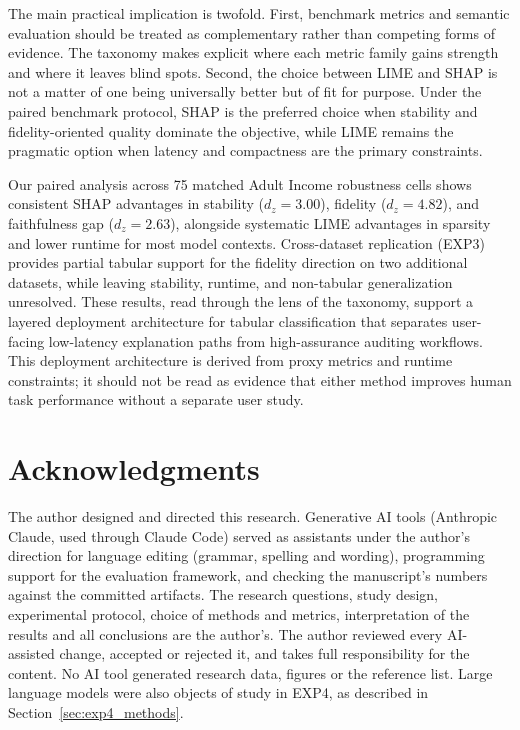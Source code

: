 \documentclass[10pt,a4paper,twoside]{article}
\begin{document}
The main practical implication is twofold. First, benchmark metrics and
semantic evaluation should be treated as complementary rather than
competing forms of evidence. The taxonomy makes explicit where each
metric family gains strength and where it leaves blind spots. Second, the
choice between LIME and SHAP is not a matter of one being universally
better but of fit for purpose. Under the paired benchmark protocol, SHAP
is the preferred choice when stability and fidelity-oriented quality
dominate the objective, while LIME remains the pragmatic option when
latency and compactness are the primary constraints.

Our paired analysis across 75 matched Adult Income robustness cells shows
consistent SHAP advantages in stability ($d_z = 3.00$), fidelity
($d_z = 4.82$), and faithfulness gap ($d_z = 2.63$), alongside systematic
LIME advantages in sparsity and lower runtime for most model contexts.
Cross-dataset replication (EXP3) provides partial tabular support for the
fidelity direction on two additional datasets, while leaving stability,
runtime, and non-tabular generalization unresolved. These results, read
through the lens of the taxonomy, support a layered deployment
architecture for tabular classification that separates user-facing
low-latency explanation paths from high-assurance auditing workflows. This
deployment architecture is derived from proxy metrics and runtime
constraints; it should not be read as evidence that either method improves
human task performance without a separate user study.

\section*{Acknowledgments}

The author designed and directed this research. Generative AI tools
(Anthropic Claude, used through Claude Code) served as assistants under the
author's direction for language editing (grammar, spelling and wording),
programming support for the evaluation framework, and checking the
manuscript's numbers against the committed artifacts. The research
questions, study design, experimental protocol, choice of methods and
metrics, interpretation of the results and all conclusions are the
author's. The author reviewed every AI-assisted change, accepted or rejected
it, and takes full responsibility for the content. No AI tool generated
research data, figures or the reference list. Large language models were also
objects of study in EXP4, as described in Section~\ref{sec:exp4_methods}.
\end{document}

